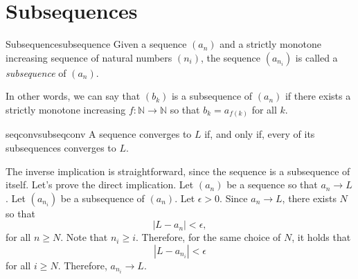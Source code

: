 \section{Subsequences}


\begin{defn}{Subsequence}{subsequence}
	Given a sequence \((a_n)\) and a strictly monotone increasing sequence of natural numbers \((n_i)\), the sequence \((a_{n_i})\) is called a \emph{subsequence} of  \((a_n)\).

In other words, we can say that \((b_k)\) is a subsequence of \((a_n)\) if there exists a strictly monotone increasing \(f: \mathbb{N} \to \mathbb{N}\) so that \(b_k = a_{f(k)}\) for all \(k\).
\end{defn}

\begin{thm}{}{seqconvsubseqconv}
	A sequence converges to \(L\) if, and only if, every of its subsequences converges to \(L\).
\end{thm}

\begin{dem}{}{}
	The inverse implication is straightforward, since the sequence is a subsequence of itself. Let's prove the direct implication.
	Let \((a_n)\) be a sequence so that \(a_n \to L\). Let \((a_{n_i})\) be a subsequence of \((a_n)\).
	Let \(\epsilon > 0\). Since \(a_n \to L\), there exists \(N\) so that \[
		|L - a_n| < \epsilon,
	\] for all \(n \geq N\). Note that \(n_i \geq i\). Therefore, for the same choice of \(N\), it holds that \[
		|L - a_{n_i}| < \epsilon
	\] for all \(i \geq N\).
	Therefore,  \(a_{n_i} \to L\).
\end{dem}
